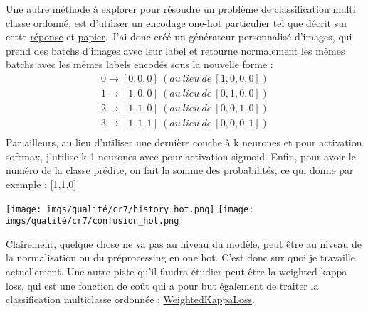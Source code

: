 \documentclass{article}
\begin{document}
Une autre méthode à explorer pour résoudre un problème de classification multi classe ordonné, est d'utiliser un encodage one-hot particulier tel que décrit sur cette \href{https://stats.stackexchange.com/questions/140061/how-to-set-up-neural-network-to-output-ordinal-data}{réponse} et  \href{https://arxiv.org/pdf/1901.07884.pdf}{papier}.
J'ai donc créé un générateur personnalisé d'images, qui prend des batchs d'images avec leur label et retourne normalement les mêmes batchs avec les mêmes labels encodés sous la nouvelle forme :\\
\begin{gather*}
0 \longrightarrow [0, 0, 0]\ (au\ lieu\ de\ [1, 0, 0, 0])\\
1 \longrightarrow [1, 0, 0]\ (au\ lieu\ de\ [0, 1, 0, 0])\\
2 \longrightarrow [1, 1, 0]\ (au\ lieu\ de\ [0, 0, 1, 0])\\
3 \longrightarrow [1, 1, 1]\ (au\ lieu\ de\ [0, 0, 0, 1])\\
\end{gather*}
Par ailleurs, au lieu d'utiliser une dernière couche à k neurones et pour activation softmax, j'utilise k-1 neurones avec pour activation sigmoid. Enfin, pour avoir le numéro de la classe prédite, on fait la somme des probabilités, ce qui donne par exemple : [1,1,0] 
\begin{center}
    \texttt{[image: imgs/qualité/cr7/history\_hot.png]}
    \texttt{[image: imgs/qualité/cr7/confusion\_hot.png]}
\end{center}

Clairement, quelque chose ne va pas au niveau du modèle, peut être au niveau de la normalisation ou du préprocessing en one hot. C'est donc sur quoi je travaille actuellement.
Une autre piste qu'il faudra étudier peut être la weighted kappa loss, qui est une fonction de coût qui a pour but également de traiter la classification multiclasse ordonnée : \href{https://www.tensorflow.org/addons/api_docs/python/tfa/losses/WeightedKappaLoss}{WeightedKappaLoss}.
\end{document}
